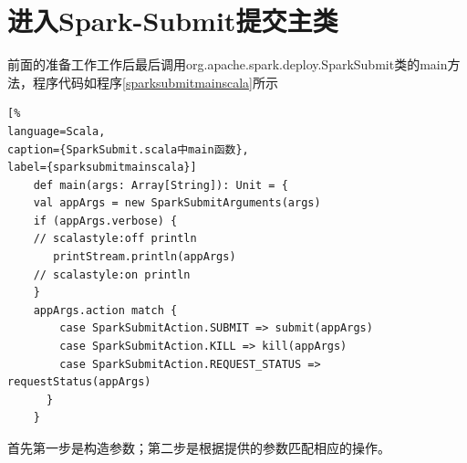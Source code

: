 \section{进入Spark-Submit提交主类}
\label{SparkSubmitMain}
前面的准备工作工作后最后调用org.apache.spark.deploy.SparkSubmit类的main方法，程序代码如程序\ref{sparksubmitmainscala}所示
\begin{lstlisting}[%
language=Scala,
caption={SparkSubmit.scala中main函数},
label={sparksubmitmainscala}]
	def main(args: Array[String]): Unit = {
	val appArgs = new SparkSubmitArguments(args)
	if (appArgs.verbose) {
	// scalastyle:off println
	   printStream.println(appArgs)
	// scalastyle:on println
	}
	appArgs.action match {
	    case SparkSubmitAction.SUBMIT => submit(appArgs)
    	case SparkSubmitAction.KILL => kill(appArgs)
	    case SparkSubmitAction.REQUEST_STATUS => requestStatus(appArgs)
	  }
	}
\end{lstlisting}
首先第一步是构造参数；第二步是根据提供的参数匹配相应的操作。
